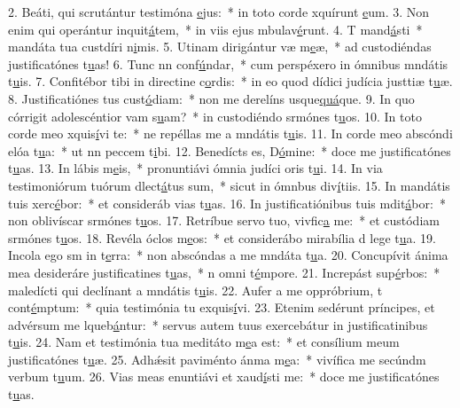 2. Beáti, qui scrutántur testimóna \uline{e}jus:~* in toto corde xquírunt \uline{e}um.
3. Non enim qui operántur inquit\uline{á}tem,~* in viis ejus mbulav\uline{é}runt.
4. T mand\uline{á}sti~* mandáta tua custdíri n\uline{i}mis.
5. Utinam dirigántur væ m\uline{e}æ,~* ad custodiéndas justificatónes t\uline{u}as!
6. Tunc nn conf\uline{ú}ndar,~* cum perspéxero in ómnibus mndátis t\uline{u}is.
7. Confitébor tibi in directine c\uline{o}rdis:~* in eo quod dídici judícia justtiæ t\uline{u}æ.
8. Justificatiónes tus cust\uline{ó}diam:~* non me derelíns usque\uline{quá}que.
9. In quo córrigit adolescéntior vam s\uline{u}am?~* in custodiéndo srmónes t\uline{u}os.
10. In toto corde meo xquis\uline{í}vi te:~* ne repéllas me a mndátis t\uline{u}is.
11. In corde meo abscóndi elóa t\uline{u}a:~* ut nn peccem t\uline{i}bi.
12. Benedícts es, D\uline{ó}mine:~* doce me justificatónes t\uline{u}as.
13. In lábis m\uline{e}is,~* pronuntiávi ómnia judíci oris t\uline{u}i.
14. In via testimoniórum tuórum dlect\uline{á}tus sum,~* sicut in ómnbus div\uline{í}tiis.
15. In mandátis tuis xerc\uline{é}bor:~* et consideráb vias t\uline{u}as.
16. In justificatiónibus tuis mdit\uline{á}bor:~* non oblivíscar srmónes t\uline{u}os.
17. Retríbue servo tuo, vivfic\uline{a} me:~* et custódiam srmónes t\uline{u}os.
18. Revéla óclos m\uline{e}os:~* et considerábo mirabília d lege t\uline{u}a.
19. Incola ego sm in t\uline{e}rra:~* non abscóndas a me mndáta t\uline{u}a.
20. Concupívit ánima mea desideráre justificatines t\uline{u}as,~* n omni t\uline{é}mpore.
21. Increpást sup\uline{é}rbos:~* maledícti qui declínant a mndátis t\uline{u}is.
22. Aufer a me oppróbrium, t cont\uline{é}mptum:~* quia testimónia tu exquis\uline{í}vi.
23. Etenim sedérunt príncipes, et advérsum me lqueb\uline{á}ntur:~* servus autem tuus exercebátur in justificatinibus t\uline{u}is.
24. Nam et testimónia tua meditáto m\uline{e}a est:~* et consílium meum justificatónes t\uline{u}æ.
25. Adhǽsit paviménto ánma m\uline{e}a:~* vivífica me secúndm verbum t\uline{u}um.
26. Vias meas enuntiávi et xaud\uline{í}sti me:~* doce me justificatónes t\uline{u}as.
